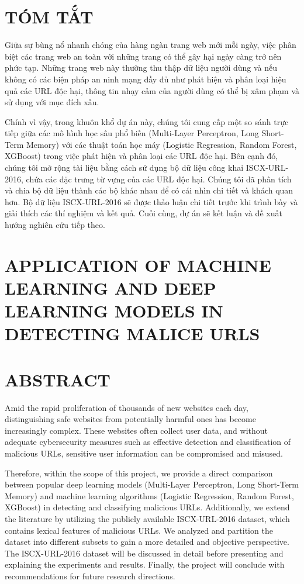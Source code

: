 \documentclass[13pt]{article}
\begin{document}
\section*{TÓM TẮT}
Giữa sự bùng nổ nhanh chóng của hàng ngàn trang web mới mỗi ngày, việc phân biệt các trang web an toàn với những trang có thể gây hại ngày càng trở nên phức tạp. Những trang web này thường thu thập dữ liệu người dùng và nếu không có các biện pháp an ninh mạng đầy đủ như phát hiện và phân loại hiệu quả các URL độc hại, thông tin nhạy cảm của người dùng có thể bị xâm phạm và sử dụng với mục đích xấu. 

Chính vì vậy, trong khuôn khổ dự án này, chúng tôi cung cấp một so sánh trực tiếp giữa các mô hình học sâu phổ biến (Multi-Layer Perceptron, Long Short-Term Memory) với các thuật toán học máy (Logistic Regression, Random Forest, XGBoost)  trong việc phát hiện và phân loại các URL độc hại. Bên cạnh đó, chúng tôi mở rộng tài liệu bằng cách sử dụng bộ dữ liệu công khai ISCX-URL-2016, chứa các đặc trưng từ vựng của các URL độc hại. Chúng tôi đã phân tích và chia bộ dữ liệu thành các bộ khác nhau để có cái nhìn chi tiết và khách quan hơn. Bộ dữ liệu ISCX-URL-2016 sẽ được thảo luận chi tiết trước khi trình bày và giải thích các thí nghiệm và kết quả. Cuối cùng, dự án sẽ kết luận và đề xuất hướng nghiên cứu tiếp theo.

\newpage
\section*{APPLICATION OF MACHINE LEARNING AND DEEP LEARNING MODELS IN DETECTING MALICE URLS}
\section*{ABSTRACT}
Amid the rapid proliferation of thousands of new websites each day, distinguishing safe websites from potentially harmful ones has become increasingly complex. These websites often collect user data, and without adequate cybersecurity measures such as effective detection and classification of malicious URLs, sensitive user information can be compromised and misused.

Therefore, within the scope of this project, we provide a direct comparison between popular deep learning models (Multi-Layer Perceptron, Long Short-Term Memory) and machine learning algorithms (Logistic Regression, Random Forest, XGBoost) in detecting and classifying malicious URLs. Additionally, we extend the literature by utilizing the publicly available ISCX-URL-2016 dataset, which contains lexical features of malicious URLs. We analyzed and partition the dataset into different subsets to gain a more detailed and objective perspective. The ISCX-URL-2016 dataset will be discussed in detail before presenting and explaining the experiments and results. Finally, the project will conclude with recommendations for future research directions.
\end{document}
